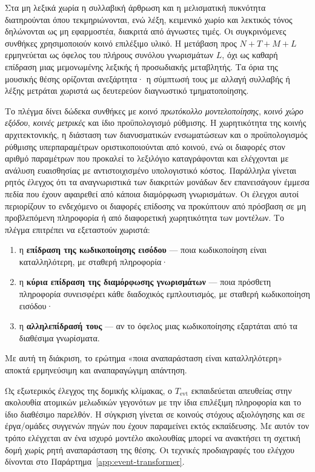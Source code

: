 \documentclass[11pt,a4paper]{article}
\begin{document}
Στα μη λεξικά χωρία η συλλαβική άρθρωση και η μελισματική πυκνότητα διατηρούνται όπου τεκμηριώνονται, ενώ λέξη, κειμενικό χωρίο και λεκτικός τόνος δηλώνονται ως μη εφαρμοστέα, διακριτά από άγνωστες τιμές. Οι συγκρινόμενες συνθήκες χρησιμοποιούν κοινό επιλέξιμο υλικό. Η μετάβαση προς \(N{+}T{+}M{+}L\) ερμηνεύεται ως όφελος του πλήρους συνόλου γνωρισμάτων \(L\), όχι ως καθαρή επίδραση μιας μεμονωμένης λεξικής ή προσωδιακής μεταβλητής. Τα όρια της μουσικής θέσης ορίζονται ανεξάρτητα· η σύμπτωσή τους με αλλαγή συλλαβής ή λέξης μετράται χωριστά ως δευτερεύον διαγνωστικό τμηματοποίησης.


Το πλέγμα δίνει δώδεκα συνθήκες με \emph{κοινό πρωτόκολλο μοντελοποίησης}, \emph{κοινό χώρο εξόδου}, \emph{κοινές μετρικές} και ίδιο προϋπολογισμό ρύθμισης. Η χωρητικότητα της κοινής αρχιτεκτονικής, η διάσταση των διανυσματικών ενσωματώσεων και ο προϋπολογισμός ρύθμισης υπερπαραμέτρων οριστικοποιούνται από κοινού, ενώ οι διαφορές στον αριθμό παραμέτρων που προκαλεί το λεξιλόγιο καταγράφονται και ελέγχονται με ανάλυση ευαισθησίας με αντιστοιχισμένο υπολογιστικό κόστος. Παράλληλα γίνεται ρητός έλεγχος ότι τα αναγνωριστικά των διακριτών μονάδων δεν επανεισάγουν έμμεσα πεδία που έχουν αφαιρεθεί από κάποια διαμόρφωση γνωρισμάτων. Οι έλεγχοι αυτοί περιορίζουν το ενδεχόμενο οι διαφορές επίδοσης να προκύπτουν από πρόσβαση σε μη προβλεπόμενη πληροφορία ή από διαφορετική χωρητικότητα των μοντέλων. Το πλέγμα επιτρέπει να εξεταστούν χωριστά:

\begin{enumerate}
\item η \textbf{επίδραση της κωδικοποίησης εισόδου} --- ποια κωδικοποίηση είναι καταλληλότερη, με σταθερή πληροφορία·
\item η \textbf{κύρια επίδραση της διαμόρφωσης γνωρισμάτων} --- ποια πρόσθετη πληροφορία συνεισφέρει κάθε διαδοχικός εμπλουτισμός, με σταθερή κωδικοποίηση εισόδου·
\item η \textbf{αλληλεπίδρασή τους} --- αν το όφελος μιας κωδικοποίησης εξαρτάται από τα διαθέσιμα γνωρίσματα.
\end{enumerate}

Με αυτή τη διάκριση, το ερώτημα «ποια αναπαράσταση είναι καταλληλότερη» αποκτά ερμηνεύσιμη και αναπαραγώγιμη απάντηση.

Ως εξωτερικός έλεγχος της δομικής κλίμακας, ο $T_{\mathrm{evt}}$ εκπαιδεύεται απευθείας στην ακολουθία ατομικών μελωδικών γεγονότων με την ίδια επιλέξιμη πληροφορία και το ίδιο διαθέσιμο παρελθόν. Η σύγκριση γίνεται σε κοινούς στόχους αξιολόγησης και σε έργα/ομάδες συγγενών πηγών που έχουν παραμείνει εκτός εκπαίδευσης. Με αυτόν τον τρόπο ελέγχεται αν ένα ισχυρό μοντέλο ακολουθίας μπορεί να ανακτήσει τη σχετική δομή χωρίς ρητή αναπαράσταση της θέσης. Οι τεχνικές προδιαγραφές του ελέγχου δίνονται στο Παράρτημα~\ref{app:event-transformer}.
\end{document}

